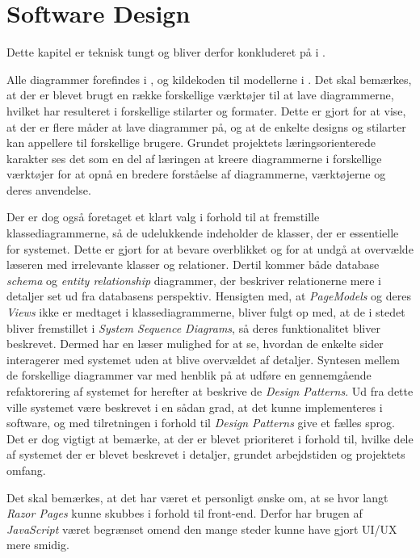 \chapter{Software Design}
\label{chapter:software-design}
Dette kapitel er teknisk tungt og bliver derfor konkluderet på i .

Alle diagrammer forefindes i , og kildekoden til modellerne i .
Det skal bemærkes, at der er blevet brugt en række forskellige værktøjer til at lave diagrammerne, hvilket har resulteret i forskellige stilarter og formater. 
Dette er gjort for at vise, at der er flere måder at lave diagrammer på, og at de enkelte designs og stilarter kan appellere til forskellige brugere.
Grundet projektets læringsorienterede karakter ses det som en del af læringen at kreere diagrammerne i forskellige værktøjer for at opnå en bredere forståelse af diagrammerne, værktøjerne og deres anvendelse.

Der er dog også foretaget et klart valg i forhold til at fremstille klassediagrammerne, så de udelukkende indeholder de klasser, der er essentielle for systemet.
Dette er gjort for at bevare overblikket og for at undgå at overvælde læseren med irrelevante klasser og relationer.
Dertil kommer både database \emph{schema} og \emph{entity relationship} diagrammer, der beskriver relationerne mere i detaljer set ud fra databasens perspektiv.
Hensigten med, at \emph{PageModels} og deres \emph{Views} ikke er medtaget i klassediagrammerne, bliver fulgt op med, at de i stedet bliver fremstillet i \emph{System Sequence Diagrams}, så deres funktionalitet bliver beskrevet.
Dermed har en læser mulighed for at se, hvordan de enkelte sider interagerer med systemet uden at blive overvældet af detaljer.
Syntesen mellem de forskellige diagrammer var med henblik på at udføre en gennemgående refaktorering af systemet for herefter at beskrive de \emph{Design Patterns}.
Ud fra dette ville systemet være beskrevet i en sådan grad, at det kunne implementeres i software, og med tilretningen i forhold til \emph{Design Patterns} give et fælles sprog.
Det er dog vigtigt at bemærke, at der er blevet prioriteret i forhold til, hvilke dele af systemet der er blevet beskrevet i detaljer, grundet arbejdstiden og projektets omfang.

Det skal bemærkes, at det har været et personligt ønske om, at se hvor langt \emph{Razor Pages} kunne skubbes i forhold til front-end. Derfor har brugen af \emph{JavaScript} været begrænset omend den mange steder kunne have gjort UI/UX mere smidig.

